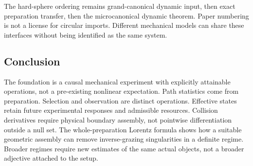 The hard-sphere ordering remains grand-canonical dynamic input, then exact preparation transfer, then the microcanonical dynamic theorem. Paper numbering is not a license for circular imports. Different mechanical models can share these interfaces without being identified as the same system.

\subsection{Conclusion}
The foundation is a causal mechanical experiment with explicitly attainable operations, not a pre-existing nonlinear expectation. Path statistics come from preparation. Selection and observation are distinct operations. Effective states retain future experimental responses and admissible resources. Collision derivatives require physical boundary assembly, not pointwise differentiation outside a null set. The whole-preparation Lorentz formula shows how a suitable geometric assembly can remove inverse-grazing singularities in a definite regime. Broader regimes require new estimates of the same actual objects, not a broader adjective attached to the setup.
\par

